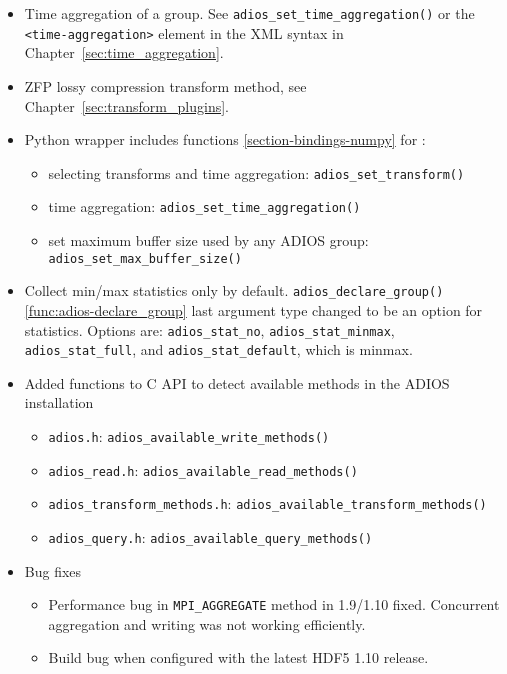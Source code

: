 \begin{itemize}
\item Time aggregation of a group. See \verb+adios_set_time_aggregation()+ or the \verb+<time-aggregation>+ element in the XML syntax in Chapter~\ref{sec:time_aggregation}.
\item ZFP lossy compression transform method, see Chapter~\ref{sec:transform_plugins}.
\item Python wrapper includes functions \ref{section-bindings-numpy} for :
	\begin{itemize}
	\item selecting transforms and time aggregation: \verb+adios_set_transform()+
	\item time aggregation: \verb+adios_set_time_aggregation()+
	\item set maximum buffer size used by any ADIOS group: \verb+adios_set_max_buffer_size()+
	\end{itemize}

\item Collect min/max statistics only by default.  \verb+adios_declare_group()+ \ref{func:adios-declare_group} last argument type changed to be an option for statistics. Options are: \verb+adios_stat_no+, \verb+adios_stat_minmax+, \verb+adios_stat_full+, and \verb+adios_stat_default+, which is minmax.
	
\item Added functions to C API to detect available methods in the ADIOS installation
      \begin{itemize}
      \item \verb+adios.h+: \verb+adios_available_write_methods()+
      \item \verb+adios_read.h+: \verb+adios_available_read_methods()+
      \item \verb+adios_transform_methods.h+: \verb+adios_available_transform_methods()+
      \item \verb+adios_query.h+: \verb+adios_available_query_methods()+
      \end{itemize}
      
\item Bug fixes
    \begin{itemize}
    \item Performance bug in \verb+MPI_AGGREGATE+ method in 1.9/1.10 fixed. Concurrent aggregation and writing was not working efficiently.  
    \item Build bug when configured with the latest HDF5 1.10 release. 
    \end{itemize}
\end{itemize}



